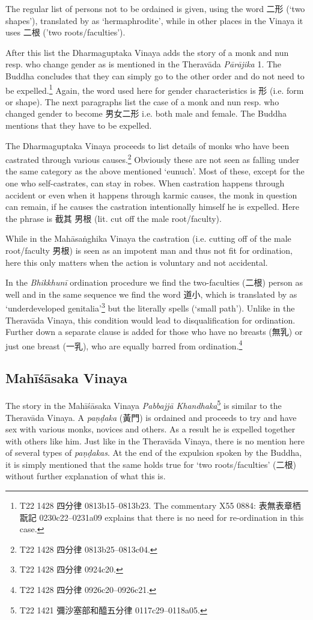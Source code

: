 The regular list of persons not to be ordained is given, using the word 二形 (`two shapes'), translated by \cite{bodhi} as `hermaphrodite', while in other places in the Vinaya it uses 二根 ('two roots/faculties'). 

After this list the Dharmaguptaka Vinaya adds the story of a monk and nun resp. who change gender as is mentioned in the Theravāda {\em Pārājika} 1. The Buddha concludes that they can simply go to the other order and do not need to be expelled.\footnote{T22 1428 四分律 0813b15–0813b23. The commentary X55 0884: 表無表章栖翫記 0230c22–0231a09 explains that there is no need for re-ordination in this case.} Again, the word used here for gender characteristics is 形 (i.e. form or shape). The next paragraphs list the case of a monk and nun resp. who changed gender to become 男女二形 i.e. both male and female. The Buddha mentions that they have to be expelled.

The Dharmaguptaka Vinaya proceeds to list details of monks who have been castrated through various causes.\footnote{T22 1428 四分律 0813b25–0813c04.} Obviously these are not seen as falling under the same category as the above mentioned `eunuch'. Most of these, except for the one who self-castrates, can stay in robes. When castration happens through accident or even when it happens through karmic causes, the monk in question can remain, if he causes the castration intentionally himself he is expelled. Here the phrase is 截其 男根 (lit. cut off the male root/faculty).

While in the Mahāsaṅghika Vinaya the castration (i.e. cutting off of the male root/faculty 男根) is seen as an impotent man and thus not fit for ordination, here this only matters when the action is voluntary and not accidental.

In the {\em Bhikkhunī} ordination procedure we find the two-faculties (二根) person as well and in the same sequence we find the word 道小, which is translated by \cite{bodhi} as `underdeveloped genitalia'\footnote{T22 1428 四分律 0924c20.} but the literally spells (`small path'). Unlike in the Theravāda Vinaya, this condition would lead to disqualification for ordination. Further down a separate clause is added for those who have no breasts (無乳) or just one breast (一乳), who are equally barred from ordination.\footnote{T22 1428 四分律 0926c20–0926c21.}


\subsection{Mahīśāsaka Vinaya}
The story in the Mahīśāsaka Vinaya {\em Pabbajjā Khandhaka}\footnote{T22 1421 彌沙塞部和醯五分律 0117c29–0118a05.} is similar to the Theravāda Vinaya. A {\em paṇḍaka} (黃門) is ordained and proceeds to try and have sex with various monks, novices and others. As a result he is expelled together with others like him. Just like in the Theravāda Vinaya, there is no mention here of several types of {\em paṇḍakas}. At the end of the expulsion spoken by the Buddha, it is simply mentioned that the same holds true for `two roots/faculties' (二根) without further explanation of what this is.


